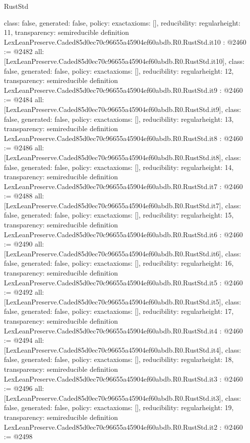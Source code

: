 \begin{lexlean}{RustStd}
\begin{coremodule}
{  class: false,
  generated: false,
  policy: exact{axioms: []},
  reducibility: regular{height: 11},
  transparency: semireducible
}
definition LexLeanPreserve.Caded85d0ec70c96655a45904ef60abdb.R0.RustStd.it10 : @2460 := @2482 {
  all: [LexLeanPreserve.Caded85d0ec70c96655a45904ef60abdb.R0.RustStd.it10],
  class: false,
  generated: false,
  policy: exact{axioms: []},
  reducibility: regular{height: 12},
  transparency: semireducible
}
definition LexLeanPreserve.Caded85d0ec70c96655a45904ef60abdb.R0.RustStd.it9 : @2460 := @2484 {
  all: [LexLeanPreserve.Caded85d0ec70c96655a45904ef60abdb.R0.RustStd.it9],
  class: false,
  generated: false,
  policy: exact{axioms: []},
  reducibility: regular{height: 13},
  transparency: semireducible
}
definition LexLeanPreserve.Caded85d0ec70c96655a45904ef60abdb.R0.RustStd.it8 : @2460 := @2486 {
  all: [LexLeanPreserve.Caded85d0ec70c96655a45904ef60abdb.R0.RustStd.it8],
  class: false,
  generated: false,
  policy: exact{axioms: []},
  reducibility: regular{height: 14},
  transparency: semireducible
}
definition LexLeanPreserve.Caded85d0ec70c96655a45904ef60abdb.R0.RustStd.it7 : @2460 := @2488 {
  all: [LexLeanPreserve.Caded85d0ec70c96655a45904ef60abdb.R0.RustStd.it7],
  class: false,
  generated: false,
  policy: exact{axioms: []},
  reducibility: regular{height: 15},
  transparency: semireducible
}
definition LexLeanPreserve.Caded85d0ec70c96655a45904ef60abdb.R0.RustStd.it6 : @2460 := @2490 {
  all: [LexLeanPreserve.Caded85d0ec70c96655a45904ef60abdb.R0.RustStd.it6],
  class: false,
  generated: false,
  policy: exact{axioms: []},
  reducibility: regular{height: 16},
  transparency: semireducible
}
definition LexLeanPreserve.Caded85d0ec70c96655a45904ef60abdb.R0.RustStd.it5 : @2460 := @2492 {
  all: [LexLeanPreserve.Caded85d0ec70c96655a45904ef60abdb.R0.RustStd.it5],
  class: false,
  generated: false,
  policy: exact{axioms: []},
  reducibility: regular{height: 17},
  transparency: semireducible
}
definition LexLeanPreserve.Caded85d0ec70c96655a45904ef60abdb.R0.RustStd.it4 : @2460 := @2494 {
  all: [LexLeanPreserve.Caded85d0ec70c96655a45904ef60abdb.R0.RustStd.it4],
  class: false,
  generated: false,
  policy: exact{axioms: []},
  reducibility: regular{height: 18},
  transparency: semireducible
}
definition LexLeanPreserve.Caded85d0ec70c96655a45904ef60abdb.R0.RustStd.it3 : @2460 := @2496 {
  all: [LexLeanPreserve.Caded85d0ec70c96655a45904ef60abdb.R0.RustStd.it3],
  class: false,
  generated: false,
  policy: exact{axioms: []},
  reducibility: regular{height: 19},
  transparency: semireducible
}
definition LexLeanPreserve.Caded85d0ec70c96655a45904ef60abdb.R0.RustStd.it2 : @2460 := @2498 {
}
\end{coremodule}
\end{lexlean}
